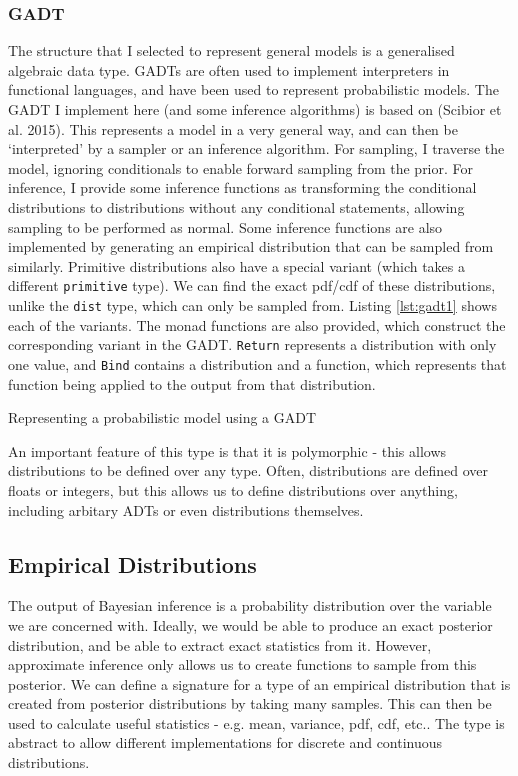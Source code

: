 \subsubsection{GADT} \label{sec:gadt}
The structure that I selected to represent general models is a generalised algebraic data type. GADTs are often used to implement interpreters in functional languages, and have been used to represent probabilistic models. The GADT I implement here (and some inference algorithms) is based on (Scibior et al. 2015)\cite{scibior2015practical}. This represents a model in a very general way, and can then be `interpreted' by a sampler or an inference algorithm. For sampling, I traverse the model, ignoring conditionals to enable forward sampling from the prior. For inference, I provide some inference functions as transforming the conditional distributions to distributions without any conditional statements, allowing sampling to be performed as normal. Some inference functions are also implemented by generating an empirical distribution that can be sampled from similarly. Primitive distributions also have a special variant (which takes a different \texttt{primitive} type). We can find the exact pdf/cdf of these distributions, unlike the \texttt{dist} type, which can only be sampled from. Listing \ref{lst:gadt1} shows each of the variants. The monad functions are also provided, which construct the corresponding variant in the GADT. \texttt{Return} represents a distribution with only one value, and \texttt{Bind} contains a distribution and a function, which represents that function being applied to the output from that distribution.

\begin{listing}[!ht]
	\caption{Representing a probabilistic model using a GADT}
	\label{lst:gadt1}
\end{listing}

An important feature of this type is that it is polymorphic - this allows distributions to be defined over any type. Often, distributions are defined over floats or integers, but this allows us to define distributions over anything, including arbitary ADTs or even distributions themselves.

\subsection{Empirical Distributions}

The output of Bayesian inference is a probability distribution over the variable we are concerned with. Ideally, we would be able to produce an exact posterior distribution, and be able to extract exact statistics from it. However, approximate inference only allows us to create functions to sample from this posterior. We can define a signature for a type of an empirical distribution that is created from posterior distributions by taking many samples. This can then be used to calculate useful statistics - e.g. mean, variance, pdf, cdf, etc.. The type is abstract to allow different implementations for discrete and continuous distributions. 
	
